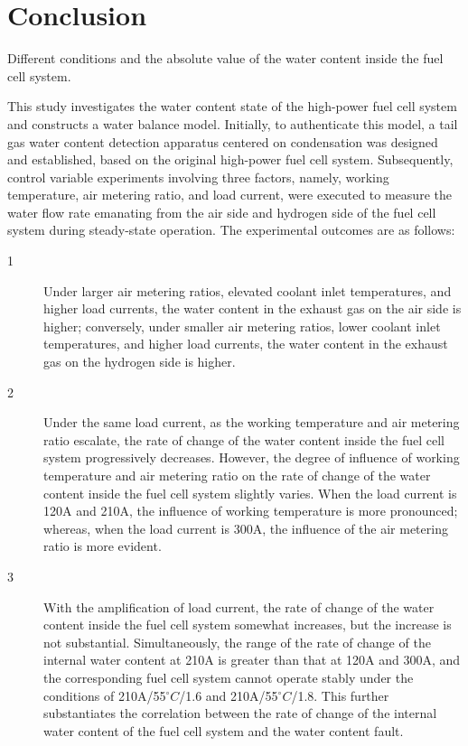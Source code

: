 \section{Conclusion}
Different conditions and the absolute value of the water content inside the fuel cell system.
\par
This study investigates the water content state of the high-power fuel cell system and constructs a water balance model. Initially, to authenticate this model, a tail gas water content detection apparatus centered on condensation was designed and established, based on the original high-power fuel cell system. Subsequently, control variable experiments involving three factors, namely, working temperature, air metering ratio, and load current, were executed to measure the water flow rate emanating from the air side and hydrogen side of the fuel cell system during steady-state operation. The experimental outcomes are as follows:
\begin{description}
    \item [1] Under larger air metering ratios, elevated coolant inlet temperatures, and higher load currents, the water content in the exhaust gas on the air side is higher; conversely, under smaller air metering ratios, lower coolant inlet temperatures, and higher load currents, the water content in the exhaust gas on the hydrogen side is higher.
    \item [2] Under the same load current, as the working temperature and air metering ratio escalate, the rate of change of the water content inside the fuel cell system progressively decreases. However, the degree of influence of working temperature and air metering ratio on the rate of change of the water content inside the fuel cell system slightly varies. When the load current is 120A and 210A, the influence of working temperature is more pronounced; whereas, when the load current is 300A, the influence of the air metering ratio is more evident.
    \item [3] With the amplification of load current, the rate of change of the water content inside the fuel cell system somewhat increases, but the increase is not substantial. Simultaneously, the range of the rate of change of the internal water content at 210A is greater than that at 120A and 300A, and the corresponding fuel cell system cannot operate stably under the conditions of 210A/55$^{\circ}C$/1.6 and 210A/55$^{\circ}C$/1.8. This further substantiates the correlation between the rate of change of the internal water content of the fuel cell system and the water content fault.
\end{description}